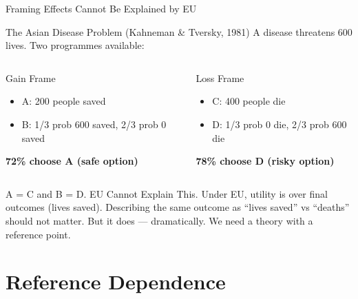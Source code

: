 \documentclass[aspectratio=169]{beamer}
\begin{document}
\begin{frame}{Framing Effects Cannot Be Explained by EU}
\begin{block}{The Asian Disease Problem (Kahneman \& Tversky, 1981)}
A disease threatens 600 lives. Two programmes available:
\end{block}
\begin{columns}
\begin{block}{Gain Frame}
\begin{itemize}
  \item A: 200 people saved
  \item B: 1/3 prob 600 saved, 2/3 prob 0 saved
\end{itemize}
\textcolor{beteal}{\textbf{72\% choose A (safe option)}}
\end{block}
\begin{alertblock}{Loss Frame}
\begin{itemize}
  \item C: 400 people die
  \item D: 1/3 prob 0 die, 2/3 prob 600 die
\end{itemize}
\textcolor{berust}{\textbf{78\% choose D (risky option)}}
\end{alertblock}
\end{columns}
\medskip
\begin{alertblock}{A = C and B = D. EU Cannot Explain This.}
Under EU, utility is over final outcomes (lives saved). Describing the same outcome as ``lives saved'' vs ``deaths'' should not matter. But it does --- dramatically. We need a theory with a \alert{reference point}.
\end{alertblock}
\end{frame}

\section{Reference Dependence}
\end{document}
